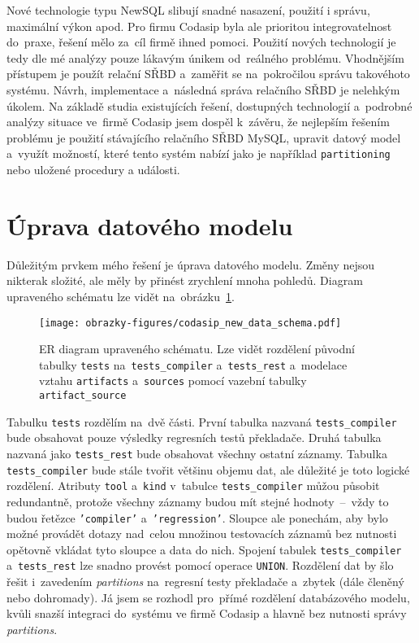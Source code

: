 Nové technologie typu NewSQL slibují snadné nasazení, použití i správu, maximální výkon apod. Pro firmu Codasip byla
ale prioritou integrovatelnost do~praxe, řešení mělo za~cíl firmě ihned pomoci. Použití nových technologií je tedy
dle mé analýzy pouze lákavým únikem od~reálného problému. Vhodnějším přístupem je použít relační SŘBD a~zaměřit se
na~pokročilou správu takovéhoto systému. Návrh, implementace a~následná správa relačního SŘBD je nelehkým úkolem.
Na základě studia existujících řešení, dostupných technologií a~podrobné analýzy situace ve~firmě Codasip jsem dospěl
k~závěru, že nejlepším řešením problému je použití stávajícího relačního SŘBD MySQL, upravit datový model a~využít
možností, které tento systém nabízí jako je například \texttt{partitioning} nebo uložené procedury a události.

\section{Úprava datového modelu}
\label{section:uprava_datoveho_modelu}
Důležitým prvkem mého řešení je úprava datového modelu. Změny nejsou nikterak složité, ale měly by přinést zrychlení
mnoha pohledů. Diagram upraveného schématu lze vidět na~obrázku~\ref{img:codasip_new_data_schema}.
\begin{figure}[H]
	\centering
	\texttt{[image: obrazky-figures/codasip\_new\_data\_schema.pdf]}
	\caption{ER diagram upraveného schématu. Lze vidět rozdělení původní tabulky \texttt{tests} na~\texttt{tests\_compiler} a~\texttt{tests\_rest} a~modelace vztahu \texttt{artifacts} a~\texttt{sources} pomocí vazební tabulky \texttt{artifact\_source}}
	\label{img:codasip_new_data_schema}
\end{figure}

Tabulku \texttt{tests} rozdělím na~dvě části. První tabulka nazvaná \texttt{tests\_compiler} bude obsahovat pouze
výsledky regresních testů překladače. Druhá tabulka nazvaná jako \texttt{tests\_rest} bude obsahovat všechny ostatní
záznamy. Tabulka \texttt{tests\_compiler} bude stále tvořit většinu objemu dat, ale důležité je toto logické
rozdělení.
Atributy \texttt{tool} a~\texttt{kind} v~tabulce \texttt{tests\_compiler} můžou působit redundantně, protože všechny
záznamy budou mít stejné hodnoty~--~vždy to budou řetězce \texttt{'compiler'} a~\texttt{'regression'}. Sloupce ale
ponechám, aby bylo možné provádět dotazy nad~celou množinou testovacích záznamů bez nutnosti opětovně vkládat tyto sloupce a data do nich. Spojení tabulek \texttt{tests\_compiler} a~\texttt{tests\_rest} lze snadno provést pomocí operace \texttt{UNION}. Rozdělení dat by šlo řešit i~zavedením \textit{partitions} na~regresní testy překladače
a~zbytek (dále členěný nebo dohromady). Já jsem se rozhodl pro~přímé rozdělení databázového modelu, kvůli snazší
integraci do~systému ve firmě Codasip a hlavně bez nutnosti správy \textit{partitions}.


